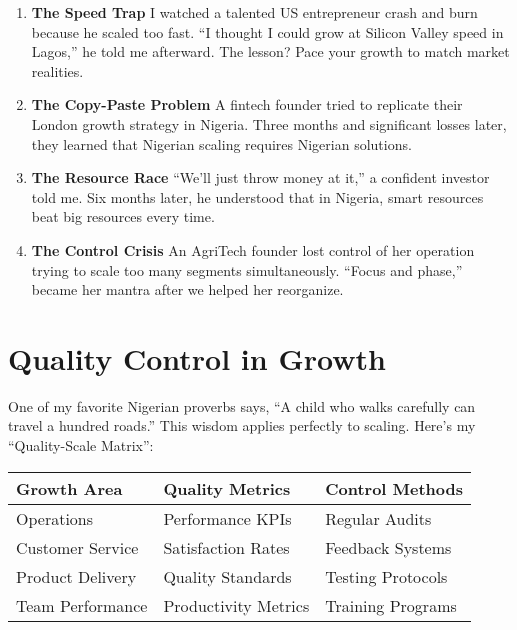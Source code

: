 \begin{enumerate}
    \item \textbf{The Speed Trap}
    I watched a talented US entrepreneur crash and burn because he scaled too fast. ``I thought I could grow at Silicon Valley speed in Lagos,'' he told me afterward. The lesson? Pace your growth to match market realities.

    \item \textbf{The Copy-Paste Problem}
    A fintech founder tried to replicate their London growth strategy in Nigeria. Three months and significant losses later, they learned that Nigerian scaling requires Nigerian solutions.

    \item \textbf{The Resource Race}
    ``We'll just throw money at it,'' a confident investor told me. Six months later, he understood that in Nigeria, smart resources beat big resources every time.

    \item \textbf{The Control Crisis}
    An AgriTech founder lost control of her operation trying to scale too many segments simultaneously. ``Focus and phase,'' became her mantra after we helped her reorganize.
\end{enumerate}

\section{Quality Control in Growth}\label{sec:quality-growth-control}

One of my favorite Nigerian proverbs says, ``A child who walks carefully can travel a hundred roads.'' This wisdom applies perfectly to scaling. Here's my ``Quality-Scale Matrix'':

\begin{center}
\begin{tabularx}{\textwidth}{>{\raggedright\arraybackslash}X >{\centering\arraybackslash}X >{\raggedright\arraybackslash}X}
    \toprule
    \textbf{Growth Area} & \textbf{Quality Metrics} & \textbf{Control Methods} \\
    \midrule
    Operations & Performance KPIs & Regular Audits \\
    Customer Service & Satisfaction Rates & Feedback Systems \\
    Product Delivery & Quality Standards & Testing Protocols \\
    Team Performance & Productivity Metrics & Training Programs \\
    \bottomrule
\end{tabularx}
\end{center}

